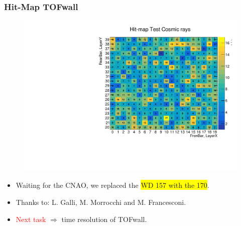 \begin{frame} [fragile]
    \small
        \frametitle{Hit-Map TOFwall}
                \begin{figure}
                 \centering
                    \includegraphics[scale=0.28]{figures/hit_map_number.pdf}
                \end{figure}
            
            
				\begin{itemize}
                    \item Waiting for the CNAO, we replaced the \colorbox{yellow}{WD 157 with the 170}.
                    \item Thanks to: L. Galli, M. Morrocchi and M. Francesconi.
                    \item \textcolor{red}{Next task} $\Longrightarrow$ time resolution of TOFwall.
                \end{itemize}    
    \end{frame}
